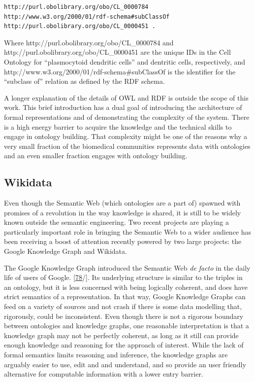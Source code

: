 \begin{verbatim}
http://purl.obolibrary.org/obo/CL_0000784  http://www.w3.org/2000/01/rdf-schema#subClassOf  http://purl.obolibrary.org/obo/CL_0000451 .
\end{verbatim}

Where http://purl.obolibrary.org/obo/CL\_0000784 and http://purl.obolibrary.org/obo/CL\_0000451 are the unique IDs in the Cell Ontology for ``plasmocytoid dendritic cells'' and dentritic cells, respectively, and http://www.w3.org/2000/01/rdf-schema\#subClassOf is the identifier for the ``subclass of'' relation as defined by the RDF schema.

A longer explanation of the details of OWL and RDF is outside the scope of this work.
This brief introduction has a dual goal of introducing the architecture of formal representations and of demonstrating the complexity of the system.
There is a high energy barrier to acquire the knowledge and the technical skills to engage in ontology building.
That complexity might be one of the reasons why a very small fraction of the biomedical communities represents data with ontologies and an even smaller fraction engages with ontology building.

\hypertarget{wikidata}{%
\subsection{Wikidata}\label{wikidata}}

Even though the Semantic Web (which ontologies are a part of) spawned with promises of a revolution in the way knowledge is shared, it is still to be widely known outside the semantic engineering. Two recent projects are playing a particularly important role in bringing the Semantic Web to a wider audience has been receiving a boost of attention recently powered by two large projects: the Google Knowledge Graph and Wikidata.

The Google Knowledge Graph introduced the Semantic Web \emph{de facto} in the daily life of users of Google. {[}\protect\hyperlink{ref-16mCkZC1r}{78}/{]}. Its underlying structure is similar to the triples in an ontology, but it is less concerned with being logically coherent, and does have strict semantics of a representation.
In that way, Google Knowledge Graphs can feed on a variety of sources and not crash if there is some data modelling that, rigorously, could be inconsistent.
Even though there is not a rigorous boundary between ontologies and knowledge graphs, one reasonable interpretation is that a knowledge graph may not be perfectly coherent, as long as it still can provide enough knowledge and reasoning for the approach of interest.
While the lack of formal semantics limits reasoning and inference, the knowledge graphs are arguably easier to use, edit and and understand, and so provide an user friendly alternative for computable information with a lower entry barrier.

